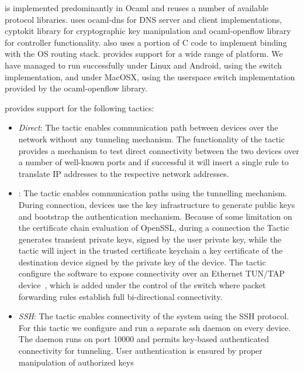 \signpost is implemented predominantly in Ocaml and reuses a number of available
protocol libraries. \signpost uses ocaml-dns for DNS server and
client implementations, cyptokit library for cryptographic key manipulation and
ocaml-openflow library for \of controller functionality. \signpost also uses a
portion of C code to implement binding with the OS routing stack. \signpost
provides support for a wide range of platform. We have managed to run \signpost
successfully under Linux and Android,
using the \ovs switch implementation, and under MacOSX, using the userspace
switch implementation provided by the ocaml-openflow library.


\signpost provides support for the following tactics: 
\begin{itemize}
  \item \emph{Direct}: The tactic enables communication path between devices
        over the network without any tunneling mechanism. The functionality of
        the tactic  provides a mechanism to test direct connectivity between the
        two devices over a number of well-known ports and if successful it will
        insert a single \of rule to translate \signpost IP addresses to the
        respective network addresses. 
  \item \emph{\openvpn}: The tactic enables communication paths using the
    \openvpn tunnelling mechanism. During connection, \signpost devices  use
    the \signpost key infrastructure to generate public keys and bootstrap
    the \openvpn authentication mechanism.  Because of some limitation on
    the certificate chain evaluation of OpenSSL, during a connection the
    Tactic generates transient private keys, signed by the user private key,
    while the tactic will inject in the trusted certificate keychain a key
    certificate of the destination device signed by the private key of the
    device. The tactic configure the \openvpn software to expose
    connectivity over an Ethernet TUN/TAP device~\cite{tuntap}, which is
    added under the control of the \of switch where \of packet forwarding
    rules establish full bi-directional connectivity.  
  \item \emph{SSH}:  The tactic enables connectivity of the system using the SSH
    protocol. For this tactic we configure and run a separate ssh daemon on
    every \signpost device. The daemon runs on port 10000 and permits
    key-based authenticated connectivity for tunneling.
    User authentication is ensured by proper manipulation of authorized keys

\end{itemize}
